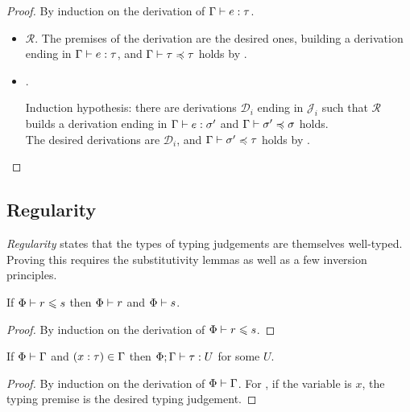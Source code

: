 \begin{proof}
By induction on the derivation of $\type{\Gamma}{e}{\tau}$.
\begin{itemize}[noitemsep, label=\textbf{Case}, leftmargin=*, labelindent=\parindent]
  \item $\mathcal{R}$. The premises of the derivation are the desired ones,
    building a derivation ending in $\type{\Gamma}{e}{\tau}$,
    and $\subtype{\Gamma}{\tau}{\tau}$ holds by
    .
  \item {}.
    \vspace{-\baselineskip}
    \begin{mathpar}
    \end{mathpar}
    Induction hypothesis: there are derivations $\mathcal{D}_i$ ending in $\mathcal{J}_i$
    such that $\mathcal{R}$ builds a derivation ending in $\type{\Gamma}{e}{\sigma'}$
    and $\subtype{\Gamma}{\sigma'}{\sigma}$ holds. \\
    The desired derivations are $\mathcal{D}_i$, and $\subtype{\Gamma}{\sigma'}{\tau}$
    holds by . \qedhere
\end{itemize}
\end{proof}

\subsection{Regularity}

\emph{Regularity}
states that the types of typing judgements are themselves well-typed.
Proving this requires the substitutivity lemmas as well as a few inversion principles.

\begin{lemma} \label{lem:wf-subsize}
If $\subsize{\Phi}{r}{s}$ then $\wf{\Phi}{r}$ and $\wf{\Phi}{s}$.
\end{lemma}

\begin{proof}
By induction on the derivation of $\subsize{\Phi}{r}{s}$.
\end{proof}

\begin{lemma} \label{lem:typed-env}
If $\wf{\Phi}{\Gamma}$ and $(\annot{x}{\tau}) \in \Gamma$
then $\type{\Phi; \Gamma}{\tau}{U}$ for some $U$.
\end{lemma}
\begin{proof}
By induction on the derivation of $\wf{\Phi}{\Gamma}$.
For , if the variable is $x$, the typing premise is the desired typing judgement.
\end{proof}

